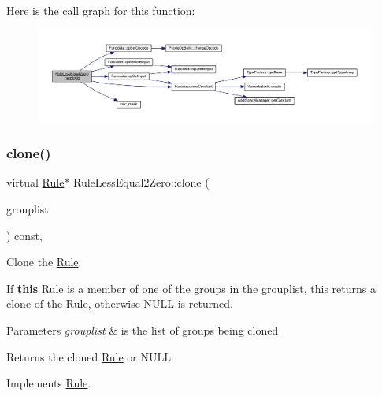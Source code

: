 Here is the call graph for this function\+:
\nopagebreak
\begin{figure}[H]
\begin{center}
\leavevmode
\includegraphics[width=350pt]{class_rule_less_equal2_zero_a1d41372d5ac60e36cca1ffcb04e33528_cgraph}
\end{center}
\end{figure}
\mbox{\label{class_rule_less_equal2_zero_a52fe85f6b4dd887377b455bfca8612c3}} 
\subsubsection{\texorpdfstring{clone()}{clone()}}
{\footnotesize\ttfamily virtual \mbox{\hyperlink{class_rule}{Rule}}$\ast$ Rule\+Less\+Equal2\+Zero\+::clone (\begin{DoxyParamCaption}\item[{const \mbox{\hyperlink{class_action_group_list}{Action\+Group\+List}} \&}]{grouplist }\end{DoxyParamCaption}) const\hspace{0.3cm}{\ttfamily [inline]}, {\ttfamily [virtual]}}



Clone the \mbox{\hyperlink{class_rule}{Rule}}. 

If {\bfseries{this}} \mbox{\hyperlink{class_rule}{Rule}} is a member of one of the groups in the grouplist, this returns a clone of the \mbox{\hyperlink{class_rule}{Rule}}, otherwise N\+U\+LL is returned. 
\begin{DoxyParams}{Parameters}
{\em grouplist} & is the list of groups being cloned \\
\hline
\end{DoxyParams}
\begin{DoxyReturn}{Returns}
the cloned \mbox{\hyperlink{class_rule}{Rule}} or N\+U\+LL 
\end{DoxyReturn}


Implements \mbox{\hyperlink{class_rule_a70de90a76461bfa7ea0b575ce3c11e4d}{Rule}}.



